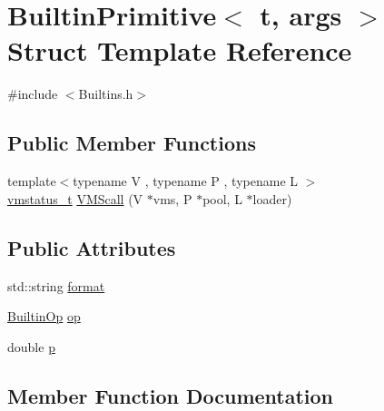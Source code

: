 \hypertarget{struct_builtin_primitive}{}\section{Builtin\+Primitive$<$ t, args $>$ Struct Template Reference}
\label{struct_builtin_primitive}


{\ttfamily \#include $<$Builtins.\+h$>$}

\subsection*{Public Member Functions}
\begin{DoxyCompactItemize}
\item 
{\footnotesize template$<$typename V , typename P , typename L $>$ }\\\hyperlink{_instruction_8h_a6202215407ab29590bb936ca2996cf64}{vmstatus\+\_\+t} \hyperlink{struct_builtin_primitive_a6403ebb7076028fa99751436768d6d81}{V\+M\+Scall} (V $\ast$vms, P $\ast$pool, L $\ast$loader)
\end{DoxyCompactItemize}
\subsection*{Public Attributes}
\begin{DoxyCompactItemize}
\item 
std\+::string \hyperlink{struct_builtin_primitive_aabf1561380f8c387cf3bf768f97bd4bd}{format}
\item 
\hyperlink{_instruction_8h_af2fb7c87c5854c5733d7bb0506b06de7}{Builtin\+Op} \hyperlink{struct_builtin_primitive_a996bd520f47a299728229774117d6188}{op}
\item 
double \hyperlink{struct_builtin_primitive_a1a8d8e62426c9454355412b80faf684c}{p}
\end{DoxyCompactItemize}


\subsection{Member Function Documentation}
\mbox{\label{struct_builtin_primitive_a6403ebb7076028fa99751436768d6d81}} 
